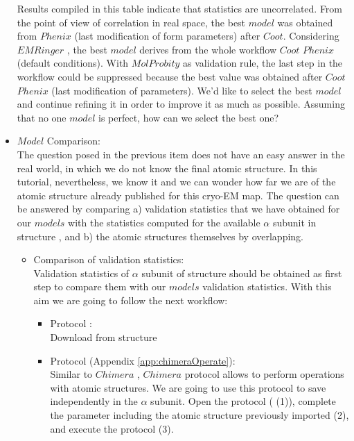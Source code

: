 \begin{itemize}
 
 Results compiled in this table indicate that statistics are uncorrelated. From the point of view of correlation in real space, the best $model$ was obtained from $Phenix$  (last modification of form parameters) after $Coot$. Considering $EMRinger$ , the best $model$ derives from the whole workflow $Coot$ \ttt{->} $Phenix$  (default conditions). With $MolProbity$  as validation rule, the last step in the workflow could be suppressed because the best value was obtained after $Coot$ \ttt{->} $Phenix$  (last modification of parameters). We'd like to select the best $model$ and continue refining it in order to improve it as much as possible. Assuming that no one $model$ is perfect, how can we select the best one?\\ 


 \item $Model$ Comparison:\\
 
 The question posed in the previous item does not have an easy answer in the real world, in which we do not know the final atomic structure. In this tutorial, nevertheless, we know it and we can wonder how far we are of the atomic structure already published for this cryo-EM map. The question can be answered by comparing a) validation statistics that we have obtained for our $models$ with the statistics computed for the available $\alpha$ subunit in  structure , and b) the atomic structures themselves by overlapping.\\ 
    
  \begin{itemize}
  \item Comparison of validation statistics: \\
  
  Validation statistics of  $\alpha$ subunit of  structure  should be obtained as first step to compare them with our $models$ validation statistics. With this aim we are going to follow the next workflow:\\
  \begin{itemize}
    \item Protocol :\\
    Download from  structure \\
    
    \item Protocol  (Appendix \ref{app:chimeraOperate}):\\
    Similar to $Chimera$ , $Chimera$  protocol allows to perform operations with atomic structures. We are going to use this protocol to save independently in \scipion the  $\alpha$ subunit. Open the protocol  ( (1)), complete the parameter  including the atomic structure  previously imported (2), and execute the protocol (3).      
    

\end{itemize}
\end{itemize}
\end{itemize}
